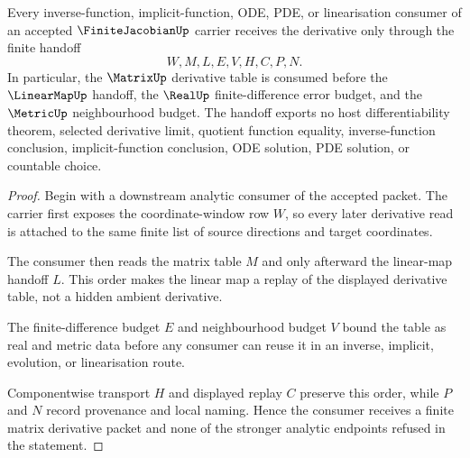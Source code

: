 \begin{theorem}
\label{thm:finite-jacobian-matrix-derivative-handoff}
Every inverse-function, implicit-function, ODE, PDE, or linearisation consumer of an accepted $\FiniteJacobianUp$ carrier receives the derivative only through the finite handoff
$$
W,M,L,E,V,H,C,P,N .
$$
In particular, the $\MatrixUp$ derivative table is consumed before the $\LinearMapUp$ handoff, the $\RealUp$ finite-difference error budget, and the $\MetricUp$ neighbourhood budget. The handoff exports no host differentiability theorem, selected derivative limit, quotient function equality, inverse-function conclusion, implicit-function conclusion, ODE solution, PDE solution, or countable choice.
\end{theorem}
\begin{proof}
Begin with a downstream analytic consumer of the accepted packet. The carrier first exposes the coordinate-window row $W$, so every later derivative read is attached to the same finite list of source directions and target coordinates.

The consumer then reads the matrix table $M$ and only afterward the linear-map handoff $L$. This order makes the linear map a replay of the displayed derivative table, not a hidden ambient derivative.

The finite-difference budget $E$ and neighbourhood budget $V$ bound the table as real and metric data before any consumer can reuse it in an inverse, implicit, evolution, or linearisation route.

Componentwise transport $H$ and displayed replay $C$ preserve this order, while $P$ and $N$ record provenance and local naming. Hence the consumer receives a finite matrix derivative packet and none of the stronger analytic endpoints refused in the statement.
\end{proof}

\begin{closurestatus}{\FiniteJacobianUp}
  \theoryclosure{\seedClosure}
  \formalstatus{\unformalizedV}
\end{closurestatus}
